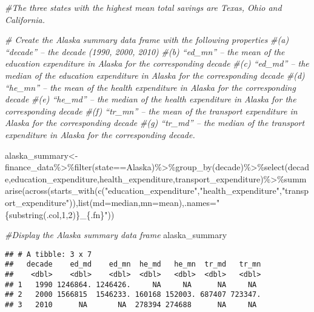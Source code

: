 \documentclass[
]{article}
\newenvironment{Shaded}{\begin{snugshade}}{\end{snugshade}}
\newcommand{\AttributeTok}[1]{\textcolor[rgb]{0.77,0.63,0.00}{#1}}
\newcommand{\CommentTok}[1]{\textcolor[rgb]{0.56,0.35,0.01}{\textit{#1}}}
\newcommand{\FunctionTok}[1]{\textcolor[rgb]{0.00,0.00,0.00}{#1}}
\newcommand{\NormalTok}[1]{#1}
\newcommand{\OtherTok}[1]{\textcolor[rgb]{0.56,0.35,0.01}{#1}}
\newcommand{\SpecialCharTok}[1]{\textcolor[rgb]{0.00,0.00,0.00}{#1}}
\newcommand{\StringTok}[1]{\textcolor[rgb]{0.31,0.60,0.02}{#1}}
\begin{document}
\begin{Shaded}
\begin{Highlighting}[]
\CommentTok{\#The three states with the highest mean total savings are Texas, Ohio and California.}

\CommentTok{\# Create the Alaska summary data frame with the following properties}
\CommentTok{\#(a) “decade” – the decade (1990, 2000, 2010)}
\CommentTok{\#(b) “ed\_mn” – the mean of the education expenditure in Alaska for the corresponding decade}
\CommentTok{\#(c) “ed\_md” – the median of the education expenditure in Alaska for the corresponding decade}
\CommentTok{\#(d) “he\_mn” – the mean of the health expenditure in Alaska for the corresponding decade}
\CommentTok{\#(e) “he\_md” – the median of the health expenditure in Alaska for the corresponding decade}
\CommentTok{\#(f) “tr\_mn” – the mean of the transport expenditure in Alaska for the corresponding decade}
\CommentTok{\#(g) “tr\_md” – the median of the transport expenditure in Alaska for the corresponding decade.}

\NormalTok{alaska\_summary}\OtherTok{\textless{}{-}}\NormalTok{finance\_data}\SpecialCharTok{\%\textgreater{}\%}\FunctionTok{filter}\NormalTok{(state}\SpecialCharTok{==}\StringTok{\textquotesingle{}Alaska\textquotesingle{}}\NormalTok{)}\SpecialCharTok{\%\textgreater{}\%}\FunctionTok{group\_by}\NormalTok{(decade)}\SpecialCharTok{\%\textgreater{}\%}\FunctionTok{select}\NormalTok{(decade,education\_expenditure,health\_expenditure,transport\_expenditure)}\SpecialCharTok{\%\textgreater{}\%}\FunctionTok{summarise}\NormalTok{(}\FunctionTok{across}\NormalTok{(}\FunctionTok{starts\_with}\NormalTok{(}\FunctionTok{c}\NormalTok{(}\StringTok{"education\_expenditure"}\NormalTok{,}\StringTok{"health\_expenditure"}\NormalTok{,}\StringTok{"transport\_expenditure"}\NormalTok{)),}\FunctionTok{list}\NormalTok{(}\AttributeTok{md=}\NormalTok{median,}\AttributeTok{mn=}\NormalTok{mean),}\AttributeTok{.names=}\StringTok{"\{substring(.col,1,2)\}\_\{.fn\}"}\NormalTok{))}

\CommentTok{\#Display the Alaska summary data frame}
\NormalTok{alaska\_summary}
\end{Highlighting}
\end{Shaded}

\begin{verbatim}
## # A tibble: 3 x 7
##   decade    ed_md    ed_mn  he_md   he_mn  tr_md   tr_mn
##    <dbl>    <dbl>    <dbl>  <dbl>   <dbl>  <dbl>   <dbl>
## 1   1990 1246864. 1246426.     NA     NA      NA     NA 
## 2   2000 1566815  1546233. 160168 152003. 687407 723347.
## 3   2010      NA       NA  278394 274688      NA     NA
\end{verbatim}
\end{document}
